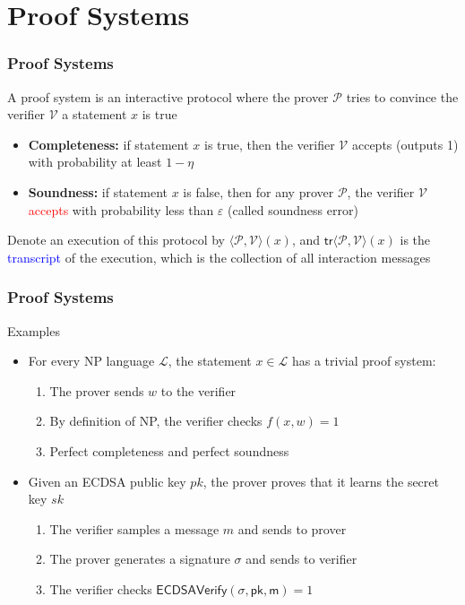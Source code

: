 \documentclass[handout]{beamer} %
\newcommand{\blue}[1]{\textcolor{blue}{#1}}
\newcommand{\dgreen}[1]{\textcolor{dgreen}{#1}}
\newcommand{\red}[1]{\textcolor{red}{#1}}
\begin{document}
\section{Proof Systems}
\frame
{
  \frametitle{Proof Systems}
  \onslide<+-> A proof system is an interactive protocol where the prover $\mathcal{P}$ tries to convince the verifier $\mathcal{V}$ a statement $x$ is true
  \begin{itemize}
    \item<+-> \textbf{Completeness:} if statement $x$ is true, then the verifier $\mathcal{V}$ \dgreen{accepts} (outputs 1) with probability at least $1-\eta$
    \item<+-> \textbf{Soundness:} if statement $x$ is false, then for any prover $\mathcal{P}$, the verifier $\mathcal{V}$ \red{accepts} with probability less than $\varepsilon$ (called soundness error)
  \end{itemize}
  \onslide<+-> Denote an execution of this protocol by $\langle\mathcal{P},\mathcal{V}\rangle(x)$, and $\mathsf{tr}\langle\mathcal{P},\mathcal{V}\rangle(x)$ is the \blue{transcript} of the execution, which is the collection of all interaction messages
}

\frame
{
  \frametitle{Proof Systems}
  \onslide<+-> Examples
  \begin{itemize}
    \item<+-> For every NP language $\mathcal{L}$, the statement $x\in\mathcal{L}$ has a trivial proof system:
    \begin{enumerate}
      \item<+-> The prover sends $w$ to the verifier
      \item<+-> By definition of NP, the verifier checks $f(x,w)=1$
      \item<+-> \dgreen{Perfect completeness} and \dgreen{perfect soundness}
    \end{enumerate}
    \item<+-> Given an ECDSA public key $pk$, the prover proves that it learns the secret key $sk$
    \begin{enumerate}
      \item<+-> The verifier samples a message $m$ and sends to prover
      \item<+-> The prover generates a signature $\sigma$ and sends to verifier
      \item<+-> The verifier checks $\mathsf{ECDSAVerify(\sigma,pk,m)}=1$
    \end{enumerate}
  \end{itemize}
}
\end{document}
